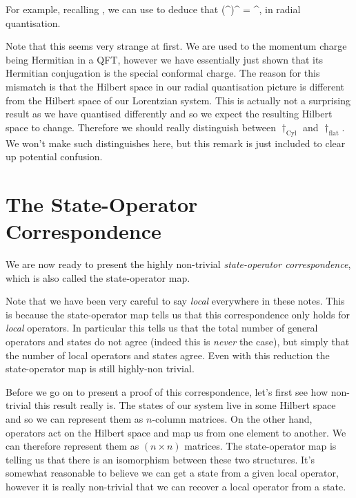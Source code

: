 For example, recalling , we can use  to deduce that 
\be
\label{eqn:KDaggerP}
    (^{\mu})^{\dagger} = ^{\mu},
\ee 
in radial quantisation. 

\badr 
    Note that this seems very strange at first. We are used to the momentum charge being Hermitian in a QFT, however we have essentially just shown that its Hermitian conjugation is the special conformal charge. The reason for this mismatch is that the Hilbert space in our radial quantisation picture is different from the Hilbert space of our Lorentzian system. This is actually not a surprising result as we have quantised differently and so we expect the resulting Hilbert space to change. Therefore we should really distinguish between $\dagger_{\text{Cyl}}$ and $\dagger_{\text{flat}}$. We won't make such distinguishes here, but this remark is just included to clear up potential confusion. 
\eadr 

\section{The State-Operator Correspondence}

We are now ready to present the highly non-trivial \textit{state-operator correspondence}, which is also called the state-operator map. 


Note that we have been very careful to say \textit{local} everywhere in these notes. This is because the state-operator map tells us that this correspondence only holds for \textit{local} operators. In particular this tells us that the total number of general operators and states do not agree (indeed this is \textit{never} the case), but simply that the number of local operators and states agree. Even with this reduction the state-operator map is still highly-non trivial.

\badr
    Before we go on to present a proof of this correspondence, let's first see how non-trivial this result really is. The states of our system live in some Hilbert space and so we can represent them as $n$-column matrices. On the other hand, operators act on the Hilbert space and map us from one element to another. We can therefore represent them as $(n\times n)$ matrices. The state-operator map is telling us that there is an isomorphism between these two structures. It's somewhat reasonable to believe we can get a state from a given local operator, however it is really non-trivial that we can recover a local operator from a state.
\eadr

